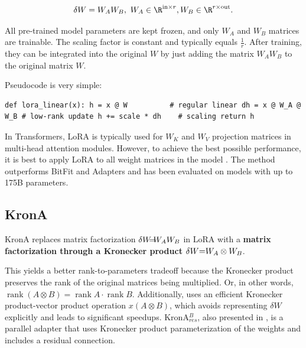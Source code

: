 \begin{equation*}
\begin{aligned}

    \delta W = W_A W_B, \ W_A \in \R^{\text{in} \times r}, W_B \in \R^{r \times \text{out}}.\\
\end{aligned}
\end{equation*}

All pre-trained model parameters are kept frozen, and only $W_A$ and $W_B$ matrices are trainable. The scaling factor is constant and typically equals $\frac{1}{r}$. After training, they can be integrated into the original $W$ by just adding the matrix $W_A W_B$ to the original matrix $W$.

Pseudocode is very simple:

\begin{lstlisting}
def lora_linear(x): h = x @ W          # regular linear dh = x @ W_A @ W_B # low-rank update h += scale * dh    # scaling return h
\end{lstlisting}

In Transformers, LoRA is typically used for $W_K$ and $W_V$ projection matrices in multi-head attention modules. However, to achieve the best possible performance, it is best to apply LoRA to all weight matrices in the model \citep{dettmers2023qlora}. The method outperforms BitFit and Adapters and has been evaluated on models with up to 175B parameters.

\subsection{KronA}
\label{sec:krona}

KronA \citep{krona} replaces matrix factorization $\delta W \mathrel{\mkern-10mu}=\mathrel{\mkern-10mu}W_A W_B$ in LoRA with a \textbf{matrix factorization through a Kronecker product $\delta W \mathrel{\mkern-5mu} = \mathrel{\mkern-5mu} W_A \otimes W_B$}.

This yields a better rank-to-parameters tradeoff because the Kronecker product preserves the rank of the original matrices being multiplied. Or, in other words, $\operatorname{rank}(A \otimes B) = \operatorname{rank}A \cdot \operatorname{rank}B$. Additionally, \citet{krona} uses an efficient Kronecker product-vector product operation $x (A \otimes B)$, which avoids representing $\delta W$ explicitly and leads to significant speedups. KronA$^B_{res}$, also presented in \citet{krona}, is a parallel adapter that uses Kronecker product parameterization of the weights and includes a residual connection.


